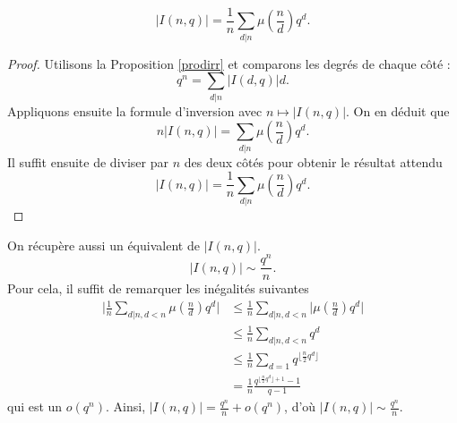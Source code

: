 \documentclass[../main.tex]{subfiles}
\begin{document}
\begin{theorem}
    \begin{equation}
        |I(n,q)| = \frac{1}{n}\sum_{d|n}\mu\left(\frac{n}{d}\right)q^{d}.
    \end{equation}
\end{theorem}
\begin{proof} Utilisons la Proposition \ref*{prodirr} et comparons les degrés de chaque côté :
    \begin{equation}
        q^n = \sum_{d|n}|I(d,q)|d.
    \end{equation}
    Appliquons ensuite la formule d'inversion avec \(n\mapsto |I(n,q)|\). On en déduit que
    \begin{equation}
        n|I(n,q)| = \sum_{d|n}\mu\left(\frac{n}{d}\right)q^{d}.
    \end{equation}
    Il suffit ensuite de diviser par \(n\) des deux côtés pour obtenir le résultat attendu
    \begin{equation}
        |I(n,q)| = \frac{1}{n}\sum_{d|n}\mu\left(\frac{n}{d}\right)q^{d}.
    \end{equation}
\end{proof}
\begin{remark} On récupère aussi un équivalent de \(|I(n,q)|\).
    \begin{equation}
        |I(n,q)| \sim \frac{q^n}{n}.
    \end{equation}
    Pour cela, il suffit de remarquer les inégalités suivantes
    \begin{align}
        \lvert\frac{1}{n}\sum_{d|n, d<n}\mu\left(\frac{n}{d}\right)q^{d}\rvert & \le \frac{1}{n}\sum_{d|n,d<n}\lvert\mu\left(\frac{n}{d}\right)q^{d}\rvert\\
        & \le \frac{1}{n}\sum_{d|n,d<n}q^{d}\\
        & \le \frac{1}{n}\sum_{d=1}q^{\lfloor \frac{n}{2} q^d\rfloor}\\
        & = \frac{1}{n} \frac{q^{\lfloor \frac{n}{2} q^d\rfloor+1}-1}{q-1}
    \end{align}
    qui est un \(o(q^n)\). Ainsi, \(|I(n,q)| = \frac{q^n}{n}+o(q^n)\), d'où \(|I(n,q)| \sim \frac{q^n}{n}\).
\end{remark}
\end{document}
